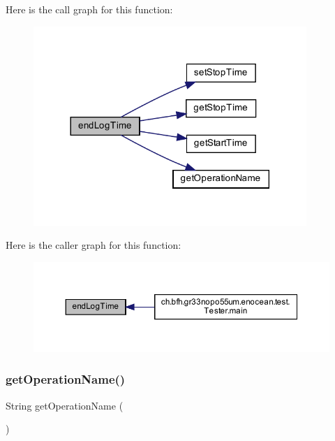 Here is the call graph for this function\+:\nopagebreak
\begin{figure}[H]
\begin{center}
\leavevmode
\includegraphics[width=293pt]{dc/d8d/classch_1_1bfh_1_1gr33nopo55um_1_1enocean_1_1helper_1_1TimeLogger_addb6ffcd531617eeac7860e0913cdc05_cgraph}
\end{center}
\end{figure}
Here is the caller graph for this function\+:\nopagebreak
\begin{figure}[H]
\begin{center}
\leavevmode
\includegraphics[width=350pt]{dc/d8d/classch_1_1bfh_1_1gr33nopo55um_1_1enocean_1_1helper_1_1TimeLogger_addb6ffcd531617eeac7860e0913cdc05_icgraph}
\end{center}
\end{figure}
\label{classch_1_1bfh_1_1gr33nopo55um_1_1enocean_1_1helper_1_1TimeLogger_a9e8e5afa9d6290cdd84017c44eaabcac} 
\subsubsection{get\+Operation\+Name()}
{\footnotesize\ttfamily String get\+Operation\+Name (\begin{DoxyParamCaption}{ }\end{DoxyParamCaption})\hspace{0.3cm}{\ttfamily [private]}}



